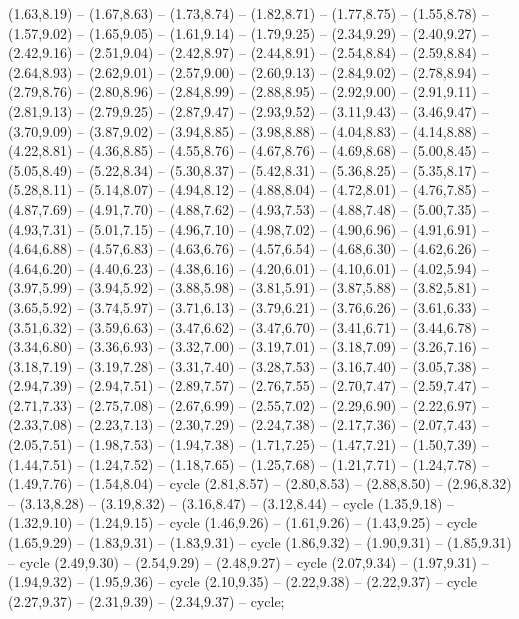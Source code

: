 { (1.63,8.19) -- (1.67,8.63) -- (1.73,8.74) -- (1.82,8.71) -- (1.77,8.75) -- (1.55,8.78) -- (1.57,9.02) -- (1.65,9.05) -- (1.61,9.14) -- (1.79,9.25) -- (2.34,9.29) -- (2.40,9.27) -- (2.42,9.16) -- (2.51,9.04) -- (2.42,8.97) -- (2.44,8.91) -- (2.54,8.84) -- (2.59,8.84) -- (2.64,8.93) -- (2.62,9.01) -- (2.57,9.00) -- (2.60,9.13) -- (2.84,9.02) -- (2.78,8.94) -- (2.79,8.76) -- (2.80,8.96) -- (2.84,8.99) -- (2.88,8.95) -- (2.92,9.00) -- (2.91,9.11) -- (2.81,9.13) -- (2.79,9.25) -- (2.87,9.47) -- (2.93,9.52) -- (3.11,9.43) -- (3.46,9.47) -- (3.70,9.09) -- (3.87,9.02) -- (3.94,8.85) -- (3.98,8.88) -- (4.04,8.83) -- (4.14,8.88) -- (4.22,8.81) -- (4.36,8.85) -- (4.55,8.76) -- (4.67,8.76) -- (4.69,8.68) -- (5.00,8.45) -- (5.05,8.49) -- (5.22,8.34) -- (5.30,8.37) -- (5.42,8.31) -- (5.36,8.25) -- (5.35,8.17) -- (5.28,8.11) -- (5.14,8.07) -- (4.94,8.12) -- (4.88,8.04) -- (4.72,8.01) -- (4.76,7.85) -- (4.87,7.69) -- (4.91,7.70) -- (4.88,7.62) -- (4.93,7.53) -- (4.88,7.48) -- (5.00,7.35) -- (4.93,7.31) -- (5.01,7.15) -- (4.96,7.10) -- (4.98,7.02) -- (4.90,6.96) -- (4.91,6.91) -- (4.64,6.88) -- (4.57,6.83) -- (4.63,6.76) -- (4.57,6.54) -- (4.68,6.30) -- (4.62,6.26) -- (4.64,6.20) -- (4.40,6.23) -- (4.38,6.16) -- (4.20,6.01) -- (4.10,6.01) -- (4.02,5.94) -- (3.97,5.99) -- (3.94,5.92) -- (3.88,5.98) -- (3.81,5.91) -- (3.87,5.88) -- (3.82,5.81) -- (3.65,5.92) -- (3.74,5.97) -- (3.71,6.13) -- (3.79,6.21) -- (3.76,6.26) -- (3.61,6.33) -- (3.51,6.32) -- (3.59,6.63) -- (3.47,6.62) -- (3.47,6.70) -- (3.41,6.71) -- (3.44,6.78) -- (3.34,6.80) -- (3.36,6.93) -- (3.32,7.00) -- (3.19,7.01) -- (3.18,7.09) -- (3.26,7.16) -- (3.18,7.19) -- (3.19,7.28) -- (3.31,7.40) -- (3.28,7.53) -- (3.16,7.40) -- (3.05,7.38) -- (2.94,7.39) -- (2.94,7.51) -- (2.89,7.57) -- (2.76,7.55) -- (2.70,7.47) -- (2.59,7.47) -- (2.71,7.33) -- (2.75,7.08) -- (2.67,6.99) -- (2.55,7.02) -- (2.29,6.90) -- (2.22,6.97) -- (2.33,7.08) -- (2.23,7.13) -- (2.30,7.29) -- (2.24,7.38) -- (2.17,7.36) -- (2.07,7.43) -- (2.05,7.51) -- (1.98,7.53) -- (1.94,7.38) -- (1.71,7.25) -- (1.47,7.21) -- (1.50,7.39) -- (1.44,7.51) -- (1.24,7.52) -- (1.18,7.65) -- (1.25,7.68) -- (1.21,7.71) -- (1.24,7.78) -- (1.49,7.76) -- (1.54,8.04) -- cycle (2.81,8.57) -- (2.80,8.53) -- (2.88,8.50) -- (2.96,8.32) -- (3.13,8.28) -- (3.19,8.32) -- (3.16,8.47) -- (3.12,8.44) -- cycle (1.35,9.18) -- (1.32,9.10) -- (1.24,9.15) -- cycle (1.46,9.26) -- (1.61,9.26) -- (1.43,9.25) -- cycle (1.65,9.29) -- (1.83,9.31) -- (1.83,9.31) -- cycle (1.86,9.32) -- (1.90,9.31) -- (1.85,9.31) -- cycle (2.49,9.30) -- (2.54,9.29) -- (2.48,9.27) -- cycle (2.07,9.34) -- (1.97,9.31) -- (1.94,9.32) -- (1.95,9.36) -- cycle (2.10,9.35) -- (2.22,9.38) -- (2.22,9.37) -- cycle (2.27,9.37) -- (2.31,9.39) -- (2.34,9.37) -- cycle;
}
